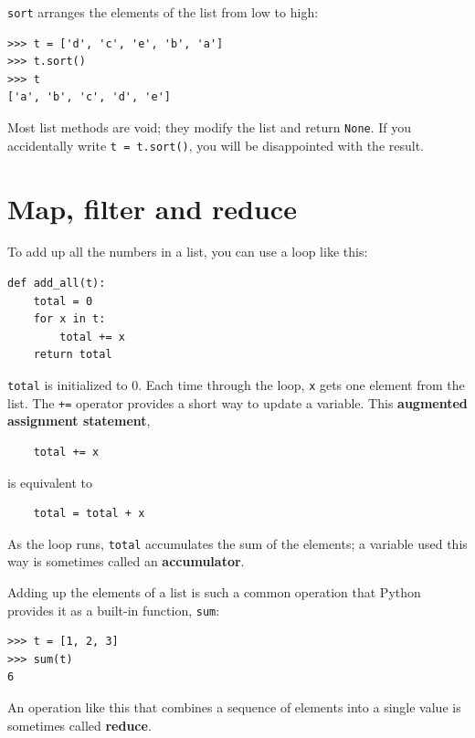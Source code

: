 \documentclass[10pt]{book}
\begin{document}
{\tt sort} arranges the elements of the list from low to high:

\begin{verbatim}
>>> t = ['d', 'c', 'e', 'b', 'a']
>>> t.sort()
>>> t
['a', 'b', 'c', 'd', 'e']
\end{verbatim}
%
Most list methods are void; they modify the list and return {\tt None}.
If you accidentally write {\tt t = t.sort()}, you will be disappointed
with the result.


\section{Map, filter and reduce}
\label{filter}

To add up all the numbers in a list, you can use a loop like this:


\begin{verbatim}
def add_all(t):
    total = 0
    for x in t:
        total += x
    return total
\end{verbatim}
%
{\tt total} is initialized to 0.  Each time through the loop,
{\tt x} gets one element from the list.  The {\tt +=} operator
provides a short way to update a variable.  This 
{\bf augmented assignment statement},

\begin{verbatim}
    total += x
\end{verbatim}
%
is equivalent to

\begin{verbatim}
    total = total + x
\end{verbatim}
%
As the loop runs, {\tt total} accumulates the sum of the
elements; a variable used this way is sometimes called an
{\bf accumulator}.

Adding up the elements of a list is such a common operation
that Python provides it as a built-in function, {\tt sum}:

\begin{verbatim}
>>> t = [1, 2, 3]
>>> sum(t)
6
\end{verbatim}
%
An operation like this that combines a sequence of elements into
a single value is sometimes called {\bf reduce}.
\end{document}
